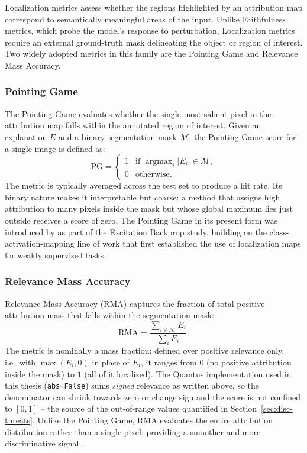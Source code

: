 Localization metrics assess whether the regions highlighted by an attribution map correspond to semantically meaningful areas of the input. Unlike Faithfulness metrics, which probe the model's response to perturbation, Localization metrics require an external ground-truth mask delineating the object or region of interest. Two widely adopted metrics in this family are the Pointing Game and Relevance Mass Accuracy.

\subsubsection{Pointing Game}
The Pointing Game evaluates whether the single most salient pixel in the attribution map falls within the annotated region of interest. Given an explanation $E$ and a binary segmentation mask $\mathcal{M}$, the Pointing Game score for a single image is defined as:
\begin{equation}
    \text{PG} = \begin{cases} 1 & \text{if } \operatorname{argmax}_{i}|E_i| \in \mathcal{M}, \\ 0 & \text{otherwise.} \end{cases}
\end{equation}
The metric is typically averaged across the test set to produce a hit rate. Its binary nature makes it interpretable but coarse: a method that assigns high attribution to many pixels inside the mask but whose global maximum lies just outside receives a score of zero. The Pointing Game in its present form was introduced by \citet{pg} as part of the Excitation Backprop study, building on the class-activation-mapping line of work that first established the use of localization maps for weakly supervised tasks.

\subsubsection{Relevance Mass Accuracy}
Relevance Mass Accuracy (RMA) captures the fraction of total positive attribution mass that falls within the segmentation mask:
\begin{equation}
    \text{RMA} = \frac{\sum_{i \in \mathcal{M}} E_i}{\sum_{i} E_i}.
\end{equation}
The metric is nominally a mass fraction: defined over positive relevance only, i.e.\ with $\max(E_i, 0)$ in place of $E_i$, it ranges from $0$ (no positive attribution inside the mask) to $1$ (all of it localized). The Quantus implementation used in this thesis (\texttt{abs=False}) sums \emph{signed} relevance as written above, so the denominator can shrink towards zero or change sign and the score is not confined to $[0, 1]$ -- the source of the out-of-range values quantified in Section~\ref{sec:disc-threats}. Unlike the Pointing Game, RMA evaluates the entire attribution distribution rather than a single pixel, providing a smoother and more discriminative signal \cite{hedstrom2023quantus}.

